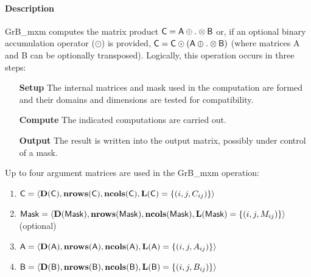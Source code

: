 \paragraph{Description}

{\sf GrB\_mxm} computes the matrix product ${\sf C} = {\sf
A} \oplus . \otimes {\sf B}$ or, if an optional binary accumulation
operator ($\odot$) is provided, ${\sf C} = {\sf C} \odot
\left({\sf A} \oplus . \otimes {\sf B}\right)$ (where matrices {\sf A}
and {\sf B} can be optionally transposed).  Logically, this operation
occurs in three steps:
\begin{enumerate}[leftmargin=0.85in]
\item[\bf Setup] The internal matrices and mask used in the computation are formed and their 
domains and dimensions are tested for compatibility.
\item[\bf Compute] The indicated computations are carried out.
\item[\bf Output] The result is written into the output matrix, possibly under control of a mask.
\end{enumerate}

Up to four argument matrices are used in the {\sf GrB\_mxm} operation:
\begin{enumerate}
	\item ${\sf C} = \langle \bold{D}({\sf C}),\bold{nrows}({\sf C}),\bold{ncols}({\sf C}),\bold{L}({\sf C}) = \{(i,j,C_{ij}) \} \rangle$
	\item ${\sf Mask} = \langle \bold{D}({\sf Mask}),\bold{nrows}({\sf Mask}),\bold{ncols}({\sf Mask}),\bold{L}({\sf Mask}) = \{(i,j,M_{ij}) \} \rangle$ (optional)
	\item ${\sf A} = \langle \bold{D}({\sf A}),\bold{nrows}({\sf A}), \bold{ncols}({\sf A}),\bold{L}({\sf A}) = \{(i,j,A_{ij}) \} \rangle$
	\item ${\sf B} = \langle \bold{D}({\sf B}),\bold{nrows}({\sf B}), \bold{ncols}({\sf B}),\bold{L}({\sf B}) = \{(i,j,B_{ij}) \} \rangle$
\end{enumerate}

